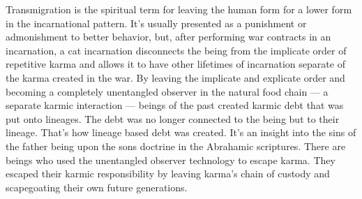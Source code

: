 Transmigration is the spiritual term for leaving the human form for a
lower form in the incarnational pattern. It's usually presented as a
punishment or admonishment to better behavior, but, after performing war
contracts in an incarnation, a cat incarnation disconnects the being
from the implicate order of repetitive karma and allows it to have other
lifetimes of incarnation separate of the karma created in the war. By
leaving the implicate and explicate order and becoming a completely
unentangled observer in the natural food chain --- a separate karmic
interaction --- beings of the past created karmic debt that was put onto
lineages. The debt was no longer connected to the being but to their
lineage. That's how lineage based debt was created. It's an insight into
the sins of the father being upon the sons doctrine in the Abrahamic
scriptures. There are beings who used the unentangled observer
technology to escape karma. They escaped their karmic responsibility by
leaving karma's chain of custody and scapegoating their own future
generations.

